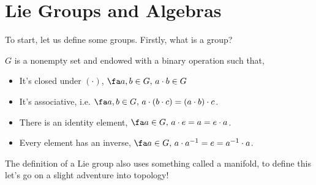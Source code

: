 
\section{Lie Groups and Algebras}

To start, let us define some groups. Firstly, what is a group?
\begin{ndefi}[Group]
  $G$ is a nonempty set and endowed with a binary operation such that,
  \begin{itemize}
    \item It's closed under $(\cdot)$, $\fa a, b \in G,\, a \cdot b \in G$
    \item It's associative, i.e. $\fa a, b \in G,\,a \cdot ( b \cdot c) = (a \cdot b) \cdot c$.
    \item There is an identity element, $\fa a \in G,\, a \cdot e = a = e \cdot a$.
    \item Every element has an inverse, $\fa a \in G,\,a \cdot a^{-1} = e = a^{-1} \cdot a$.
  \end{itemize}
\end{ndefi}

The definition of a Lie group also uses something called a manifold, to define this let's go on a slight adventure into topology!


